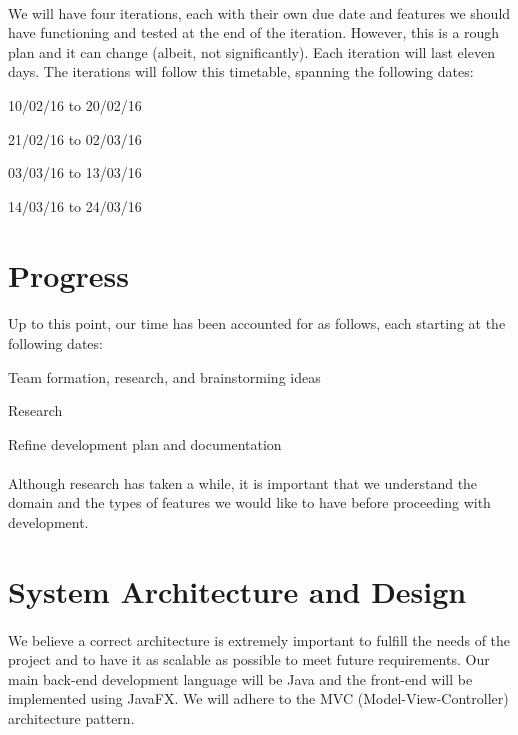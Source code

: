 \documentclass[11pt, a4paper]{article}
\begin{document}
\paragraph{}
We will have four iterations, each with their own due date and features we should have functioning and tested at the end of the iteration. However, this is a rough plan and it can change (albeit, not significantly). Each iteration will last eleven days. The iterations will follow this timetable, spanning the following dates:
\begin{description}[itemsep = -1ex]
\item[Iteration 1] 10/02/16 to 20/02/16
\item[Iteration 2] 21/02/16 to 02/03/16
\item[Iteration 3] 03/03/16 to 13/03/16
\item[Iteration 4] 14/03/16 to 24/03/16
\end{description}
\section{Progress} 
\paragraph{}
Up to this point, our time has been accounted for as follows, each starting at the following dates:
\begin{description}[itemsep = -1ex]
\item[21/01/16] Team formation, research, and brainstorming ideas
\item[29/01/16] Research
\item[01/02/16] Refine development plan and documentation
\end{description}
\paragraph{}
Although research has taken a while, it is important that we understand the domain and the types of features we would like to have before proceeding with development.
\section{System Architecture and Design}
\paragraph{}
We believe a correct architecture is extremely important to fulfill the needs of the project and to have it as scalable as possible to meet future requirements. Our main back-end development language will be Java and the front-end will be implemented using JavaFX. We will adhere to the MVC (Model-View-Controller) architecture pattern. 
\end{document}

